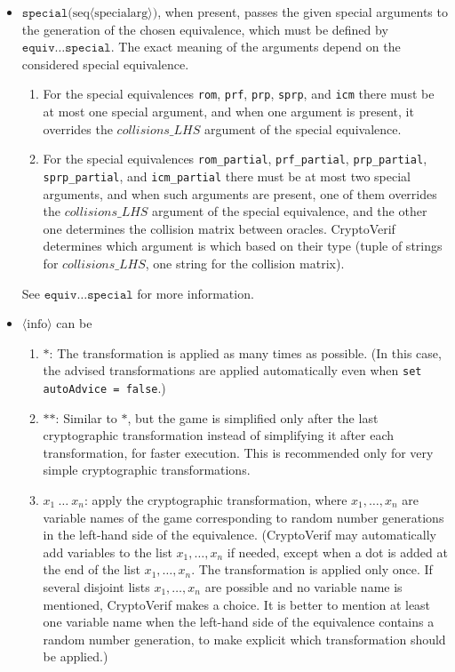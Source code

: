 \documentclass{article}
\newcommand{\nonterm}[1]{\langle\textrm{#1}\rangle}
\newcommand{\seq}[1]{\textrm{seq}\nonterm{#1}}
\begin{document}
\begin{itemize}
\begin{itemize}
\item $\texttt{special(}\seq{specialarg}\texttt{)}$, when present, 
passes the given special arguments to the generation of the chosen equivalence,
which must be defined by $\texttt{equiv} \dots \texttt{special}$. The exact meaning
of the arguments depend on the considered special equivalence.
\begin{enumerate}
\item For the special equivalences \texttt{rom}, \texttt{prf}, \texttt{prp},
  \texttt{sprp}, and \texttt{icm}
there must be at most one special argument, and when one argument is present, it
overrides the $\mathit{collisions\_LHS}$ argument of the special equivalence.
\item For the special equivalences \texttt{rom\_partial}, \texttt{prf\_partial}, \texttt{prp\_partial}, \texttt{sprp\_partial}, and \texttt{icm\_partial}
there must be at most two special arguments, and when such arguments are present, 
one of them overrides the $\mathit{collisions\_LHS}$ argument of the special equivalence,
and the other one determines the collision matrix between oracles.
CryptoVerif determines which argument is which based on their type (tuple of strings for
$\mathit{collisions\_LHS}$, one string for the collision matrix).
\end{enumerate}
See $\texttt{equiv} \dots \texttt{special}$ for more information.

\item $\nonterm{info}$ can be
\begin{enumerate}
\item $\texttt{*}$: 
The transformation is applied as many times as possible. (In this
case, the advised transformations are applied automatically even when
\texttt{set autoAdvice = false}.)

\item $\texttt{**}$: Similar to $\texttt{*}$, but the game is simplified
only after the last cryptographic transformation instead of simplifying it
after each transformation, for faster execution. This is recommended
only for very simple cryptographic transformations.

\item $x_1\ \ldots\ x_n$: apply the cryptographic
transformation, where $x_1, \ldots, x_n$ are variable
names of the game corresponding to random number generations 
in the left-hand side of the
equivalence. (CryptoVerif may automatically add variables to the list
$x_1, \ldots, x_n$ if needed, except when a dot is added at the end of
the list $x_1, \ldots, x_n$. The transformation is applied only once.
If several disjoint lists $x_1, \ldots, x_n$ are possible and no variable
name is mentioned, CryptoVerif makes a choice. It is better to mention
at least one variable name when the left-hand side of the equivalence
contains a random number generation, to make explicit which transformation 
should be applied.)


\end{enumerate}
\end{itemize}
\end{itemize}
\end{document}
